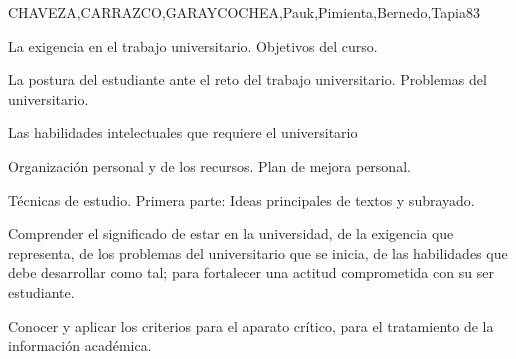 \begin{syllabus}
\begin{outcomes}
\end{outcomes}

\begin{unit}{}{CHAVEZA,CARRAZCO,GARAYCOCHEA,Pauk,Pimienta,Bernedo,Tapia}{8}{3}
\begin{topics}
        \item La exigencia en el trabajo universitario. Objetivos del curso.
        \item La postura del estudiante ante el reto del trabajo universitario. Problemas  del universitario.     
        \item Las  habilidades intelectuales que requiere el universitario
        \item Organización personal y de los recursos. Plan de mejora personal.
        \item Técnicas de estudio. Primera parte: Ideas principales de textos y subrayado.       
\end{topics}
\begin{learningoutcomes}
        \item Comprender el  significado de estar en  la universidad, de la exigencia que representa, de los problemas del universitario que se inicia, de las habilidades que debe desarrollar como tal; para fortalecer una actitud comprometida con su ser estudiante.
        \item Conocer y aplicar los criterios para el aparato crítico, para el tratamiento de la información académica.
\end{learningoutcomes}
\end{unit}


\end{syllabus}
